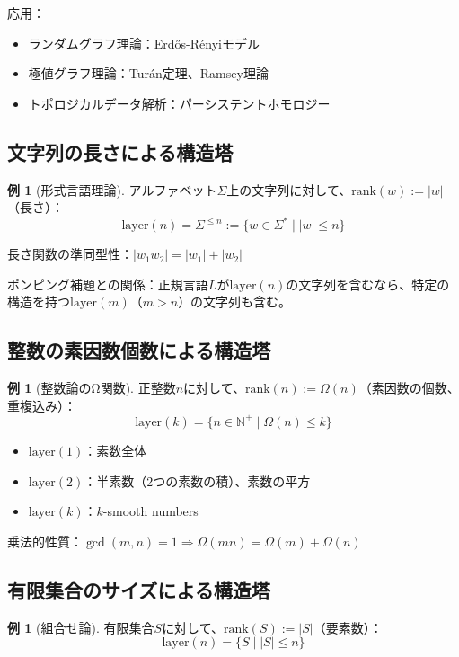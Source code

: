 \documentclass[a4paper,12pt]{ltjsarticle}
\theoremstyle{definition}
\newtheorem{example}[definition]{例}
\begin{document}
応用：
\begin{itemize}
\item ランダムグラフ理論：Erdős-Rényiモデル
\item 極値グラフ理論：Turán定理、Ramsey理論
\item トポロジカルデータ解析：パーシステントホモロジー
\end{itemize}

\subsection{文字列の長さによる構造塔}

\begin{example}[形式言語理論]
アルファベット$\Sigma$上の文字列に対して、$\text{rank}(w) := |w|$（長さ）：
$$\text{layer}(n) = \Sigma^{\leq n} := \{w \in \Sigma^* \mid |w| \leq n\}$$
\end{example}

長さ関数の準同型性：$|w_1 w_2| = |w_1| + |w_2|$

ポンピング補題との関係：正規言語$L$が$\text{layer}(n)$の文字列を含むなら、特定の構造を持つ$\text{layer}(m)$（$m > n$）の文字列も含む。

\subsection{整数の素因数個数による構造塔}

\begin{example}[整数論のΩ関数]
正整数$n$に対して、$\text{rank}(n) := \Omega(n)$（素因数の個数、重複込み）：
$$\text{layer}(k) = \{n \in \mathbb{N}^+ \mid \Omega(n) \leq k\}$$
\end{example}

\begin{itemize}
\item $\text{layer}(1)$：素数全体
\item $\text{layer}(2)$：半素数（2つの素数の積）、素数の平方
\item $\text{layer}(k)$：$k$-smooth numbers
\end{itemize}

乗法的性質：$\gcd(m,n) = 1 \Rightarrow \Omega(mn) = \Omega(m) + \Omega(n)$

\subsection{有限集合のサイズによる構造塔}

\begin{example}[組合せ論]
有限集合$S$に対して、$\text{rank}(S) := |S|$（要素数）：
$$\text{layer}(n) = \{S \mid |S| \leq n\}$$
\end{example}
\end{document}
